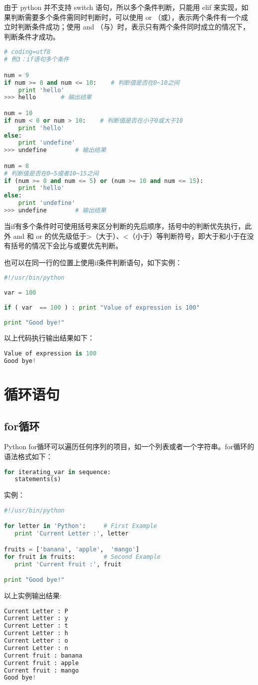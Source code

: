 由于 python 并不支持 switch 语句，所以多个条件判断，只能用 elif 来实现，如果判断需要多个条件需同时判断时，可以使用 or （或），表示两个条件有一个成立时判断条件成功；使用 and （与）时，表示只有两个条件同时成立的情况下，判断条件才成功。
\begin{lstlisting}[language=Python]
# coding=utf8
# 例3：if语句多个条件

num = 9
if num >= 0 and num <= 10:    # 判断值是否在0~10之间
    print 'hello'
>>> hello		# 输出结果

num = 10
if num < 0 or num > 10:    # 判断值是否在小于0或大于10
    print 'hello'
else:
	print 'undefine'
>>> undefine		# 输出结果

num = 8
# 判断值是否在0~5或者10~15之间
if (num >= 0 and num <= 5) or (num >= 10 and num <= 15):    
    print 'hello'
else:
    print 'undefine'
>>> undefine		# 输出结果
\end{lstlisting}
当if有多个条件时可使用括号来区分判断的先后顺序，括号中的判断优先执行，此外 and 和 or 的优先级低于>（大于）、<（小于）等判断符号，即大于和小于在没有括号的情况下会比与或要优先判断。

也可以在同一行的位置上使用if条件判断语句，如下实例：
\begin{lstlisting}[language=Python]
#!/usr/bin/python 
 
var = 100 
 
if ( var  == 100 ) : print "Value of expression is 100" 
 
print "Good bye!" 
\end{lstlisting}
以上代码执行输出结果如下：
\begin{lstlisting}[language=Python]
Value of expression is 100
Good bye!
\end{lstlisting}



\section{循环语句}
\subsection{for循环}
Python for循环可以遍历任何序列的项目，如一个列表或者一个字符串。for循环的语法格式如下：
\begin{lstlisting}[language=Python]
for iterating_var in sequence:
   statements(s)
\end{lstlisting}
实例：
\begin{lstlisting}[language=Python]
#!/usr/bin/python

for letter in 'Python':     # First Example
   print 'Current Letter :', letter

fruits = ['banana', 'apple',  'mango']
for fruit in fruits:        # Second Example
   print 'Current fruit :', fruit

print "Good bye!"
\end{lstlisting}
以上实例输出结果:
\begin{lstlisting}[language=Python]
Current Letter : P
Current Letter : y
Current Letter : t
Current Letter : h
Current Letter : o
Current Letter : n
Current fruit : banana
Current fruit : apple
Current fruit : mango
Good bye!
\end{lstlisting}

